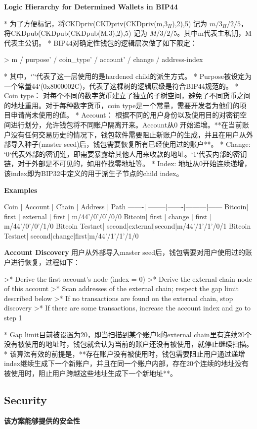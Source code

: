 \textbf{Logic Hierarchy for Determined Wallets in BIP44}

* 为了方便标记，将CKDpriv(CKDpriv(CKDpriv(m,$3_H$),2),5) 记为 $m/3_H/2/5$，将CKDpub(CKDpub(CKDpub(M,3),2),5) 记为 $M/3/2/5$。其中m代表主私钥，M代表主公钥。
* BIP44对确定性钱包的逻辑层次做了如下限定：

> m / purpose' / coin_type' / account' / change / address-index

* 其中，`'`代表了这一层使用的是hardened child的派生方式。
* Purpose被设定为一个常量44‘(0x8000002C)，代表了这棵树的逻辑层级是符合BIP44规范的。
* Coin type： 对每个不同的数字货币建立了独立的子树空间，避免了不同货币之间的地址重用。对于每种数字货币，coin type是一个常量，需要开发者为他们的项目申请尚未使用的值。
* Account： 根据不同的用户身份以及使用目的对密钥空间进行划分，允许钱包将不同账户隔离开来。Account从0 开始递增。**在当前账户没有任何交易历史的情况下，钱包软件需要阻止新账户的生成，并且在用户从外部导入种子(master seed)后，钱包需要恢复所有已经使用过的账户**。
* Change: `0`代表外部的密钥链，即需要暴露给其他人用来收款的地址。`1`代表内部的密钥链，对于外部是不可见的，如用作找零地址等。
* Index: 地址从0开始连续递增，该index即为BIP32中定义的用于派生子节点的child index。

\textbf{Examples}

Coin   | Account | Chain | Address | Path 
-------| --------|-------|---------|------
Bitcoin| first   | external | first | m/44'/0'/0'/0/0 
Bitcoin| first   | change | first | m/44'/0'/0'/1/0 
Bitcoin Testnet| second|external|second|m/44'/1'/1'/0/1
Bitcoin Testnet| second|change|first|m/44'/1'/1'/1/0

\textbf{Account Discovery}
用户从外部导入master seed后，钱包需要对用户使用过的账户进行恢复，过程如下：

>* Derive the first account's node (index = 0)
>* Derive the external chain node of this account
>* Scan addresses of the external chain; respect the gap limit described below
>* If no transactions are found on the external chain, stop discovery
>* If there are some transactions, increase the account index and go to step 1

* Gap limit目前被设置为20，即当扫描到某个账户k的external chain里有连续20个没有被使用的地址时，钱包就会认为当前的账户还没有被使用，就停止继续扫描。
* 该算法有效的前提是，**存在账户没有被使用时，钱包需要阻止用户通过递增index继续生成下一个新账户，并且在同一个账户内部，存在20个连续的地址没有被使用时，阻止用户跨越这些地址生成下一个新地址**。


\subsection{ Security}
\label{sec-security}
\textbf{该方案能够提供的安全性}

